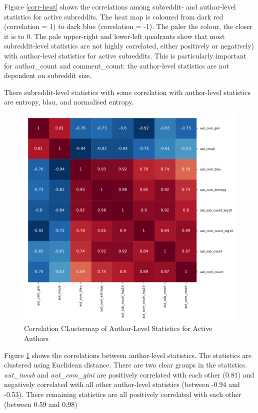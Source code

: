 Figure \ref{corr-heat} shows the correlations among subreddit- and author-level statistics for active subreddits. The heat map is coloured from dark red (correlation = 1) to dark blue (correlation = -1). The paler the colour, the closer it is to 0. The pale upper-right and lower-left quadrants show that most subreddit-level statistics are not highly correlated, either positively or negatively) with author-level statistics for active subreddits. This is particularly important for author\_count and comment\_count: the author-level statistics are not dependent on subreddit size.

There subreddit-level statistics with some correlation with author-level statistics are entropy, blau, and normalised entropy.


\begin{figure}
    \includegraphics[scale=0.8]{latex/matrix/corr-cluster-aut-active.pdf}
    \caption{Correlation CLustermap of Author-Level Statistics for Active Authors}
    \label{corr-cluster-aut}
\end{figure}

Figure \ref{corr-cluster-aut} shows the correlations between author-level statistics. The statistics are clustered using Euclidean distance. There are two clear groups in the statistics. \textit{aut\_insub} and \textit{aut\_com\_gini} are positively correlated with each other (0.81) and negatively correlated with all other author-level statistics (between -0.94 and -0.53). There remaining statistics are all positively correlated with each other (between 0.59 and 0.98)

